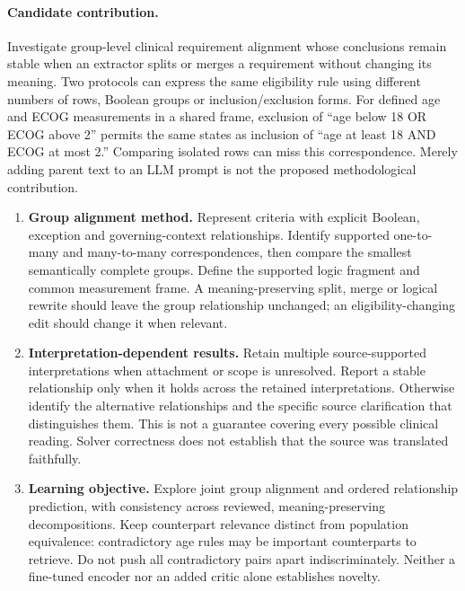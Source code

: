 \documentclass[10pt,letterpaper]{article}
\begin{document}
\paragraph{Candidate contribution.}
Investigate group-level clinical requirement alignment whose conclusions
remain stable when an extractor splits or merges a requirement without
changing its meaning. Two protocols can express the same eligibility rule
using different numbers of rows, Boolean groups or inclusion/exclusion forms.
For defined age and ECOG measurements in a shared frame, exclusion of
``age below 18 OR ECOG above 2'' permits the same states as inclusion of
``age at least 18 AND ECOG at most 2.'' Comparing isolated rows can miss this
correspondence. Merely adding parent text to an LLM prompt is not the proposed
methodological contribution.

\begin{enumerate}
\item \textbf{Group alignment method.} Represent criteria with explicit
Boolean, exception and governing-context relationships. Identify supported
one-to-many and many-to-many correspondences, then compare the smallest
semantically complete groups. Define the supported logic fragment and common
measurement frame. A meaning-preserving split, merge or logical rewrite should
leave the group relationship unchanged; an eligibility-changing edit should
change it when relevant.
\item \textbf{Interpretation-dependent results.} Retain multiple
source-supported interpretations when attachment or scope is unresolved.
Report a stable relationship only when it holds across the retained
interpretations. Otherwise identify the alternative relationships and the
specific source clarification that distinguishes them. This is not a guarantee
covering every possible clinical reading. Solver correctness does not establish
that the source was translated faithfully.
\item \textbf{Learning objective.} Explore joint group alignment and ordered
relationship prediction, with consistency across reviewed, meaning-preserving
decompositions. Keep counterpart relevance distinct from population equivalence:
contradictory age rules may be important counterparts to retrieve. Do not push
all contradictory pairs apart indiscriminately. Neither a fine-tuned encoder
nor an added critic alone establishes novelty.
\end{enumerate}
\end{document}
